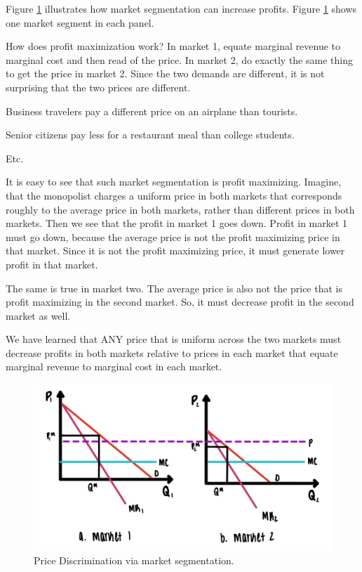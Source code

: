 \documentclass[
]{book}
\begin{document}
Figure \ref{fig:monopoly07} illustrates how market segmentation can increase profits. Figure \ref{fig:monopoly07} shows one market segment in each panel.

How does profit maximization work? In market 1, equate marginal revenue to marginal cost and then read of the price. In market 2, do exactly the same thing to get the price in market 2. Since the two demands are different, it is not surprising that the two prices are different.

Business travelers pay a different price on an airplane than tourists.

Senior citizens pay less for a restaurant meal than college students.

Etc.

It is easy to see that such market segmentation is profit maximizing. Imagine, that the monopolist charges a uniform price in both markets that corresponds roughly to the average price in both markets, rather than different prices in both markets. Then we see that the profit in market 1 goes down. Profit in market 1 must go down, because the average price is not the profit maximizing price in that market. Since it is not the profit maximizing price, it must generate lower profit in that market.

The same is true in market two. The average price is also not the price that is profit maximizing in the second market. So, it must decrease profit in the second market as well.

We have learned that ANY price that is uniform across the two markets must decrease profits in both markets relative to prices in each market that equate marginal revenue to marginal cost in each market.

\begin{figure}

{\centering \includegraphics[width=0.9\linewidth]{img/monopoly/fig7} 

}

\caption{Price Discrimination via market segmentation.}\label{fig:monopoly07}
\end{figure}
\end{document}
